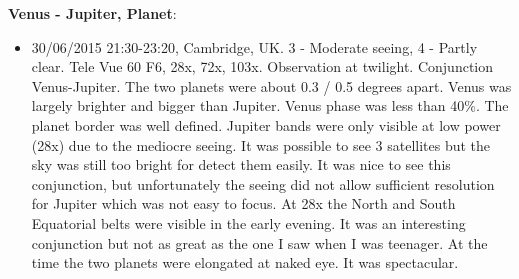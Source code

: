 {\bf Venus - Jupiter, Planet}:
\begin{itemize}
\item 30/06/2015 21:30-23:20, Cambridge, UK. 3 - Moderate seeing, 4 - Partly clear. Tele Vue 60 F6, 28x, 72x, 103x. Observation at twilight. Conjunction Venus-Jupiter. The two planets were about 0.3 / 0.5 degrees apart. Venus was largely brighter and bigger than Jupiter. Venus phase was less than 40\%. The planet border was well defined. Jupiter bands were only visible at low power (28x) due to the mediocre seeing. It was possible to see 3 satellites but the sky was still too bright for detect them easily. It was nice to see this conjunction, but unfortunately the seeing did not allow sufficient resolution for Jupiter which was not easy to focus. At 28x the North and South Equatorial belts were visible in the early evening. It was an interesting conjunction but not as great as the one I saw when I was teenager. At the time the two planets were elongated at naked eye. It was spectacular.
\end{itemize}
